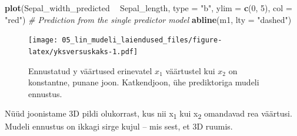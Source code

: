 \documentclass[]{book}
\newenvironment{Shaded}{\begin{snugshade}}{\end{snugshade}}
\newcommand{\CommentTok}[1]{\textcolor[rgb]{0.56,0.35,0.01}{\textit{#1}}}
\newcommand{\DataTypeTok}[1]{\textcolor[rgb]{0.13,0.29,0.53}{#1}}
\newcommand{\DecValTok}[1]{\textcolor[rgb]{0.00,0.00,0.81}{#1}}
\newcommand{\KeywordTok}[1]{\textcolor[rgb]{0.13,0.29,0.53}{\textbf{#1}}}
\newcommand{\NormalTok}[1]{#1}
\newcommand{\OperatorTok}[1]{\textcolor[rgb]{0.81,0.36,0.00}{\textbf{#1}}}
\newcommand{\StringTok}[1]{\textcolor[rgb]{0.31,0.60,0.02}{#1}}
\begin{document}
\begin{Shaded}
\end{Shaded}



\begin{Shaded}
\begin{Highlighting}[]
\KeywordTok{plot}\NormalTok{(Sepal_width_predicted }\OperatorTok{~}\StringTok{ }\NormalTok{Sepal_length, }\DataTypeTok{type =} \StringTok{"b"}\NormalTok{, }\DataTypeTok{ylim =} \KeywordTok{c}\NormalTok{(}\DecValTok{0}\NormalTok{, }\DecValTok{5}\NormalTok{), }\DataTypeTok{col =} \StringTok{"red"}\NormalTok{)}
\CommentTok{# Prediction from the single predictor model}
\KeywordTok{abline}\NormalTok{(m1, }\DataTypeTok{lty =} \StringTok{"dashed"}\NormalTok{)}
\end{Highlighting}
\end{Shaded}

\begin{figure}
\centering
\texttt{[image: 05\_lin\_mudeli\_laiendused\_files/figure-latex/yksversuskaks-1.pdf]}
\caption{\label{fig:yksversuskaks}Ennustatud y väärtused erinevatel \(x_1\) väärtustel kui \(x_2\) on konstantne, punane joon. Katkendjoon, ühe prediktoriga mudeli ennustus.}
\end{figure}

Nüüd joonistame 3D pildi olukorrast, kus nii x\textsubscript{1} kui x\textsubscript{2} omandavad rea väärtusi. Mudeli ennustus on ikkagi sirge kujul -- mis sest, et 3D ruumis.
\end{document}
